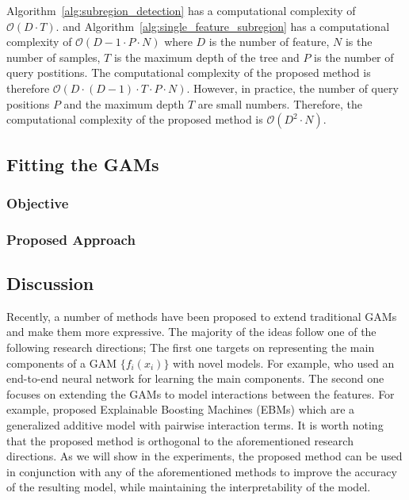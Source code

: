 \documentclass[12pt]{article}
\begin{document}
Algorithm~\ref{alg:subregion_detection} has a computational complexity of $\mathcal{O}(D \cdot T)$.
and Algorithm~\ref{alg:single_feature_subregion} has a computational complexity of $\mathcal{O}(D-1 \cdot P \cdot N)$
where $D$ is the number of feature, $N$ is the number of samples, $T$ is the maximum depth of the tree and $P$ is the number of query postitions.
The computational complexity of the proposed method is therefore $\mathcal{O}(D \cdot (D-1) \cdot T \cdot P \cdot N)$.
However, in practice, the number of query positions $P$ and the maximum depth $T$ are small numbers.
Therefore, the computational complexity of the proposed method is $\mathcal{O}(D^2 \cdot N)$.

\subsection{Fitting the GAMs}

\subsubsection{Objective}

\subsubsection{Proposed Approach}

\subsection{Discussion}

Recently, a number of methods have been proposed to extend traditional GAMs and make them more expressive.
The majority of the ideas follow one of the following research directions;
The first one targets on representing the main components of a GAM $\{ f_i(x_i) \}$ with novel models.
For example, \citet{agarwal2021neural} who used an end-to-end neural network for learning the main components.
The second one focuses on extending the GAMs to model interactions between the features.
For example, \citet{lou2013accurate} proposed Explainable Boosting Machines (EBMs) which are a generalized additive model with pairwise interaction terms.
It is worth noting that the proposed method is orthogonal to the aforementioned research directions.
As we will show in the experiments, the proposed method can be used in conjunction with any of the
aforementioned methods to improve the accuracy of the resulting model, while maintaining the interpretability of the model.
\end{document}
